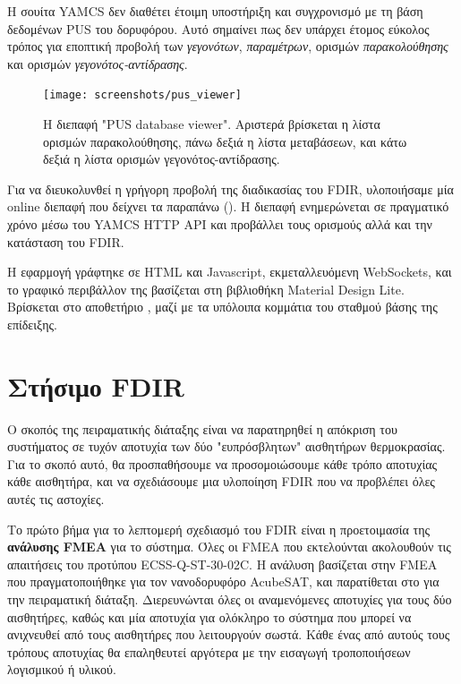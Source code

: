 \documentclass[a4paper,nobib]{tufte-book}
\begin{document}
Η σουίτα \acs{YAMCS} δεν διαθέτει έτοιμη υποστήριξη και συγχρονισμό με τη βάση δεδομένων \acs{PUS} του δορυφόρου. Αυτό σημαίνει πως δεν υπάρχει έτομος εύκολος τρόπος για εποπτική προβολή των \emph{γεγονότων}, \emph{παραμέτρων}, ορισμών \emph{παρακολούθησης} και ορισμών \emph{γεγονότος-αντίδρασης}.

\begin{figure}[h]
	\texttt{[image: screenshots/pus\_viewer]}
	\caption[Η διεπαφή "PUS database viewer"]{Η διεπαφή "\acs{PUS} database viewer". Αριστερά βρίσκεται η λίστα ορισμών παρακολούθησης, πάνω δεξιά η λίστα μεταβάσεων, και κάτω δεξιά η λίστα ορισμών γεγονότος-αντίδρασης.}
	\label{fig:pusviewer}
\end{figure}

Για να διευκολυνθεί η γρήγορη προβολή της διαδικασίας του \acs{FDIR}, υλοποιήσαμε μία online διεπαφή που δείχνει τα παραπάνω (). Η διεπαφή ενημερώνεται σε πραγματικό χρόνο μέσω του \acs{YAMCS} \acs{HTTP} \acs{API} και προβάλλει τους ορισμούς αλλά και την κατάσταση του \acs{FDIR}.

Η εφαρμογή γράφτηκε σε HTML και Javascript, εκμεταλλευόμενη WebSockets, και το γραφικό περιβάλλον της βασίζεται στη βιβλιοθήκη Material Design Lite. Βρίσκεται στο αποθετήριο , μαζί με τα υπόλοιπα κομμάτια του σταθμού βάσης της επίδειξης.


\section{Στήσιμο \ac{FDIR}}

Ο σκοπός της πειραματικής διάταξης είναι να παρατηρηθεί η απόκριση του συστήματος σε τυχόν αποτυχία των δύο "ευπρόσβλητων" αισθητήρων θερμοκρασίας. Για το σκοπό αυτό, θα προσπαθήσουμε να προσομοιώσουμε κάθε τρόπο αποτυχίας κάθε αισθητήρα, και να σχεδιάσουμε μια υλοποίηση \ac{FDIR} που να προβλέπει όλες αυτές τις αστοχίες.

Το πρώτο βήμα για το λεπτομερή σχεδιασμό του \ac{FDIR} είναι η προετοιμασία της \textbf{ανάλυσης FMEA} για το σύστημα. Όλες οι \ac{FMEA} που εκτελούνται ακολουθούν τις απαιτήσεις του προτύπου ECSS-Q-ST-30-02C.\autocite{ECSS-Q-ST-30-02C} Η ανάλυση βασίζεται στην \ac{FMEA} που πραγματοποιήθηκε για τον νανοδορυφόρο AcubeSAT,\autocite{retselis_acubesat_fmea_2020} και παρατίθεται στο  για την πειραματική διάταξη. Διερευνώνται όλες οι αναμενόμενες αποτυχίες για τους δύο αισθητήρες, καθώς και μία αποτυχία για ολόκληρο το σύστημα που μπορεί να ανιχνευθεί από τους αισθητήρες που λειτουργούν σωστά. Κάθε ένας από αυτούς τους τρόπους αποτυχίας θα επαληθευτεί αργότερα με την εισαγωγή τροποποιήσεων λογισμικού ή υλικού.
\end{document}
